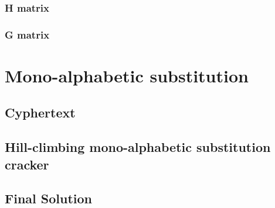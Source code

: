 \documentclass[pdftex, 12pt, a4paper]{article}
\begin{document}
\subsubsection{H matrix}\label{h-matrix}
\subsubsection{G matrix}\label{g-matrix}

\section{Mono-alphabetic substitution}
\subsection{Cyphertext}\label{q3-cyphertext}

\subsection{Hill-climbing mono-alphabetic substitution cracker}\label{break-simplesub}

\pagebreak

\subsection{Final Solution}\label{q3-solution}
\pagebreak
\end{document}
